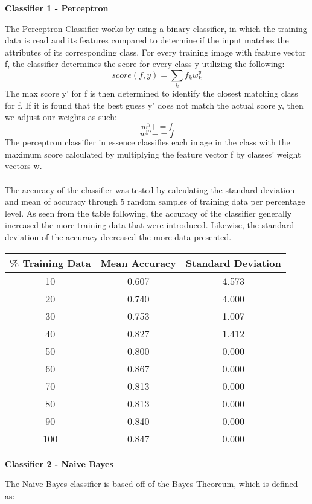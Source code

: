 \documentclass[11pt]{article}
\begin{document}
    \begin{center}
        \Large
        \textbf{Classifier 1 - Perceptron}
    \end{center}
    \normalsize
        The Perceptron Classifier works by using a binary classifier, in which the training data is read and its features compared to determine if the input matches the attributes of its corresponding class. For every training image with feature vector f, the classifier determines the score for every class y utilizing the following:
    \[score(f,y) = \sum_{k}f_k w_k^y\]
    The max score y' for f is then determined to identify the closest matching class for f. If it is found that the best guess y' does not match the actual score y, then we adjust our weights as such:
    \[w^y += f\]
    \[w^y' -= f\]
    The perceptron classifier in essence classifies each image in the class with the maximum score calculated by multiplying the feature vector f by classes' weight vectors w.\\
    \\
    The accuracy of the classifier was tested by calculating the standard deviation and mean of accuracy through 5 random samples of training data per percentage level. As seen from the table following, the accuracy of the classifier generally increased the more training data that were introduced. Likewise, the standard deviation of the accuracy decreased the more data presented. \\
    \begin{center}
    \begin{tabular}{||c c c||} 
     \hline
     \% Training Data & Mean Accuracy & Standard Deviation \\ [0.5ex] 
     \hline\hline
     10 & 0.607 & 4.573 \\ 
     \hline
     20 & 0.740 & 4.000 \\ 
     \hline
     30 & 0.753 & 1.007 \\ 
     \hline
     40 & 0.827 & 1.412 \\ 
     \hline
     50 & 0.800 & 0.000 \\ 
     \hline
     60 & 0.867 & 0.000 \\ 
     \hline
     70 & 0.813 & 0.000 \\ 
     \hline
     80 & 0.813 & 0.000 \\ 
     \hline
     90 & 0.840 & 0.000 \\ 
     \hline
     100 & 0.847 & 0.000 \\ 
     \hline
    \end{tabular}
    \end{center}
    \begin{center}
        \Large
        \textbf{Classifier 2 - Naive Bayes}
    \end{center}
    \normalsize
    The Naive Bayes classifier is based off of the Bayes Theoreum, which is defined as:\\
    
\end{document}
